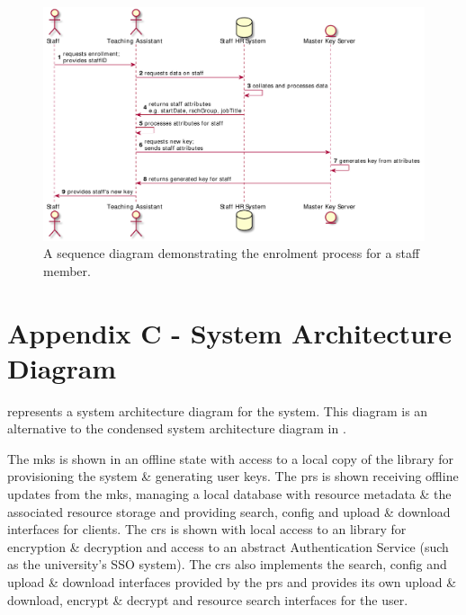 \begin{appendices}
\begin{figure}[htp]
    \centering
    \label{fig:appendix_sta_deployment}
    \includegraphics[width=\linewidth,keepaspectratio]{appendices/diagrams/flow_of_info/enrollment_sta_sequence.pdf}

    \caption{A sequence diagram demonstrating the enrolment process for a staff member.}

\end{figure}

\section{Appendix C - System Architecture Diagram}
\label{appendix:architecture_diagram}

 represents a system architecture diagram for the \theResServer system. This diagram is an alternative to the condensed system architecture diagram in .

The \acrfull{mks} is shown in an offline state with access to a local copy of the \OpenABE library for provisioning the system \& generating user keys. The \acrfull{prs} is shown receiving offline updates from the \acrshort{mks}, managing a local database with resource metadata \& the associated resource storage and providing search, config and upload \& download interfaces for clients. The \acrfull{crs} is shown with local access to an \OpenABE library for encryption \& decryption and access to an abstract Authentication Service (such as the university's SSO system). The \acrshort{crs} also implements the search, config and upload \& download interfaces provided by the \acrshort{prs} and provides its own upload \& download, encrypt \& decrypt and resource search interfaces for the user.


\end{appendices}
